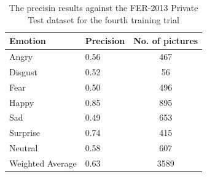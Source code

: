 \documentclass[runningheads,a4paper,11pt]{report}
\begin{document}
\begin{table}[htbp]
	\caption{The precisin results against the FER-2013 Private Test dataset for the fourth training trial}
	\label{fer_training_28k_001_mean_square_private_test}
		\begin{center}
			\begin{tabular}{p{110pt}p{110pt}c}
				\textbf{Emotion}& \textbf{Precision}& \textbf{No. of pictures} \\
				\hline\hline
				Angry& 0.56& 467 \\
				Disgust& 0.52& 56 \\
				Fear& 0.50& 496 \\
				Happy& 0.85& 895 \\
				Sad& 0.49& 653 \\
				Surprise& 0.74& 415 \\
				Neutral& 0.58& 607 \\
				\hline
				Weighted Average& 0.63 &3589
			\end{tabular}
		\end{center}
\end{table}
\end{document}
